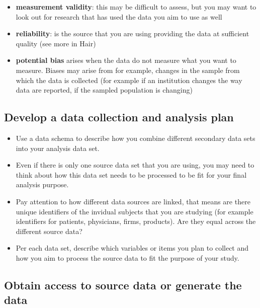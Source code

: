 \documentclass[
]{book}
\providecommand{\tightlist}{%
  \setlength{\itemsep}{0pt}\setlength{\parskip}{0pt}}
\begin{document}
\begin{itemize}
\tightlist
\item
  \textbf{measurement validity}: this may be difficult to assess, but
  you may want to look out for research that has used the data you aim
  to use as well
\item
  \textbf{reliability}: is the source that you are using providing the
  data at sufficient quality (see more in Hair)
\item
  \textbf{potential bias} arises when the data do not measure what you
  want to measure. Biases may arise from for example, changes in the
  sample from which the data is collected (for example if an institution
  changes the way data are reported, if the sampled population is
  changing)
\end{itemize}

\hypertarget{develop-a-data-collection-and-analysis-plan}{%
\subsection{Develop a data collection and analysis
plan}\label{develop-a-data-collection-and-analysis-plan}}

\begin{itemize}
\tightlist
\item
  Use a data schema to describe how you combine different secondary data
  sets into your analysis data set.
\item
  Even if there is only one source data set that you are using, you may
  need to think about how this data set needs to be processed to be fit
  for your final analysis purpose.
\item
  Pay attention to how different data sources are linked, that means are
  there unique identifiers of the invidual subjects that you are
  studying (for example identifiers for patients, physicians, firms,
  products). Are they equal across the different source data?
\item
  Per each data set, describe which variables or items you plan to
  collect and how you aim to process the source data to fit the purpose
  of your study.
\end{itemize}

\hypertarget{obtain-access-to-source-data-or-generate-the-data}{%
\subsection{Obtain access to source data or generate the
data}\label{obtain-access-to-source-data-or-generate-the-data}}
\end{document}
